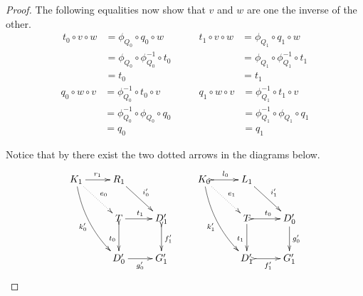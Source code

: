 \begin{proof}
	The following equalities now show that $v$ and $w$ are one the inverse of the other.
	\[\begin{split}
		t_0\circ v\circ w &=\phi_{Q_0}\circ q_0\circ w\\&=\phi_{Q_0}\circ \phi^{-1}_{Q_0} \circ t_0\\&=t_0 	\end{split}\qquad \begin{split}
		t_1\circ v\circ w &=\phi_{Q_1}\circ q_1\circ w\\&=\phi_{Q_1}\circ \phi^{-1}_{Q_1} \circ t_1\\&=t_1
	\end{split}\]
	\[\begin{split}q_0\circ w\circ v&=\phi^{-1}_{Q_0}	\circ t_0\circ v\\&=\phi^{-1}_{Q_0} \circ \phi_{Q_0}\circ q_0\\&=q_0 
	\end{split}\qquad \begin{split}
	q_1\circ w\circ v&=\phi^{-1}_{Q_1}	\circ t_1\circ v\\&=\phi^{-1}_{Q_1} \circ \phi_{Q_1}\circ q_1\\&=q_1
	\end{split}\]
	
	Notice that by  there exist the two dotted arrows in the diagrams below.
	\[\xymatrix{K_1 \ar[r]^{r_1} \ar@/_.3cm/[ddr]_{k'_0} \ar@{.>}[dr]^{e_0}& R_1  \ar[dr]^{i'_0}  && K_0 \ar@{>->}[r]^{l_0} \ar@/_.3cm/[ddr]_{k'_1} \ar@{.>}[dr]^{e_1}& L_1  \ar[dr]^{i'_1} \\& T\ar@{>->}[d]_{t_0} \ar[r]^{t_1}& D'_1  \ar@{>->}[d]^{f'_1} && T \ar@{>->}[r]^{t_0} \ar[d]_{t_1}& D'_0 \ar[d]^{g'_0}\\&D'_0 \ar[r]_{g'_0} & G'_1 && D'_1\ar@{>->}[r]_{f'_1} & G'_1}\]
	

\end{proof}
